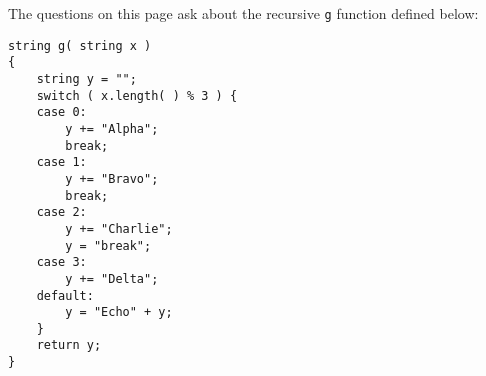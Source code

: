 \documentclass[addpoints,12pt]{exam}
\newcommand{\Soln}[1]{{\color{red}{SOLUTION: #1}}}%
\newcommand{\SolnNo}{\Soln{No solutions provided for this sample, it is up to you to verify your understanding of the topic using the resources that are available to you. Ask your peers, use office hours, use \hyperlink{https://edstem.org/us/courses/72170/discussion}{EdStem}.}}
\begin{document}
\begin{questions}

    \newpage
    

 The questions on this page ask about the recursive \texttt{g} function defined below:
\begin{verbatim}
string g( string x )
{
    string y = "";
    switch ( x.length( ) % 3 ) {
    case 0:
        y += "Alpha";
        break;
    case 1:
        y += "Bravo";
        break;
    case 2:
        y += "Charlie";
        y = "break";
    case 3:
        y += "Delta";
    default:
        y = "Echo" + y;
    }
    return y;
}
\end{verbatim}

\end{questions}
\end{document}
